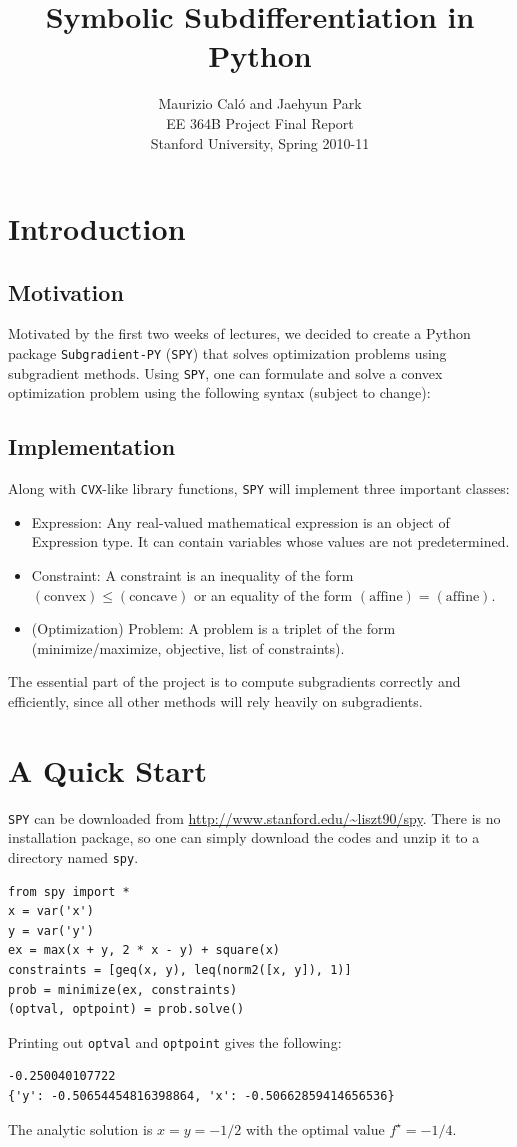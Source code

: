 \documentclass[12pt]{article}
\title{Symbolic Subdifferentiation in Python}
\author{Maurizio Cal\'o and Jaehyun Park\\
EE 364B Project Final Report\\
Stanford University, Spring 2010-11}
\begin{document}
\maketitle

\section{Introduction}
\subsection{Motivation}
Motivated by the first two weeks of lectures, we decided to create a
Python package \verb'Subgradient-PY' (\verb'SPY') that solves
optimization problems using subgradient methods. Using \verb'SPY', one can formulate and solve a convex optimization problem using the
following syntax (subject to change):

\subsection{Implementation}
Along with \verb'CVX'-like library functions, \verb'SPY' will implement three
important classes:
\begin{itemize}
\item Expression: Any real-valued mathematical expression is an object
of Expression type. It can contain variables whose values are not
predetermined.
\item Constraint: A constraint is an inequality of the form
$(\mbox{convex}) \le (\mbox{concave})$ or an equality of the form
$(\mbox{affine}) = (\mbox{affine})$.
\item (Optimization) Problem: A problem is a triplet of the form (minimize/maximize, objective, list of constraints).
\end{itemize}

The essential part of the project is to compute subgradients correctly
and efficiently, since all other methods will rely heavily on subgradients.

\section{A Quick Start}
\verb'SPY' can be downloaded from \url{http://www.stanford.edu/~liszt90/spy}. There is no installation package, so one can simply download the codes and unzip it to a directory named \verb'spy'.
\begin{verbatim}
from spy import *
x = var('x')
y = var('y')
ex = max(x + y, 2 * x - y) + square(x)
constraints = [geq(x, y), leq(norm2([x, y]), 1)]
prob = minimize(ex, constraints)
(optval, optpoint) = prob.solve()
\end{verbatim}
Printing out \verb'optval' and \verb'optpoint' gives the following:
\begin{verbatim}
-0.250040107722
{'y': -0.50654454816398864, 'x': -0.50662859414656536}
\end{verbatim}
The analytic solution is $x=y=-1/2$ with the optimal value $f^\star = -1/4$.
\end{document}
